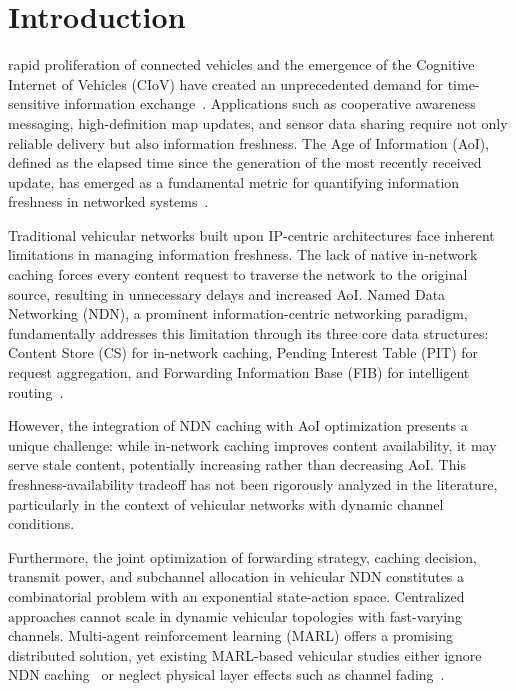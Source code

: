 \documentclass[journal]{IEEEtran}
\begin{document}
\section{Introduction} \label{sec:introduction}

 rapid proliferation of connected vehicles and the emergence of the Cognitive Internet of Vehicles (CIoV) have created an unprecedented demand for time-sensitive information exchange~\cite{Lim2024, Khan2024}. Applications such as cooperative awareness messaging, high-definition map updates, and sensor data sharing require not only reliable delivery but also information freshness. The Age of Information (AoI), defined as the elapsed time since the generation of the most recently received update, has emerged as a fundamental metric for quantifying information freshness in networked systems~\cite{Kaul2012, Sun2019}.

Traditional vehicular networks built upon IP-centric architectures face inherent limitations in managing information freshness. The lack of native in-network caching forces every content request to traverse the network to the original source, resulting in unnecessary delays and increased AoI. Named Data Networking (NDN), a prominent information-centric networking paradigm, fundamentally addresses this limitation through its three core data structures: Content Store (CS) for in-network caching, Pending Interest Table (PIT) for request aggregation, and Forwarding Information Base (FIB) for intelligent routing~\cite{Dhara2023, Wang2024a, Silva2024}.

However, the integration of NDN caching with AoI optimization presents a unique challenge: while in-network caching improves content availability, it may serve stale content, potentially increasing rather than decreasing AoI. This freshness-availability tradeoff has not been rigorously analyzed in the literature, particularly in the context of vehicular networks with dynamic channel conditions.

Furthermore, the joint optimization of forwarding strategy, caching decision, transmit power, and subchannel allocation in vehicular NDN constitutes a combinatorial problem with an exponential state-action space. Centralized approaches cannot scale in dynamic vehicular topologies with fast-varying channels. Multi-agent reinforcement learning (MARL) offers a promising distributed solution, yet existing MARL-based vehicular studies either ignore NDN caching~\cite{Ning2024} or neglect physical layer effects such as channel fading~\cite{Wang2024b}.
\end{document}
